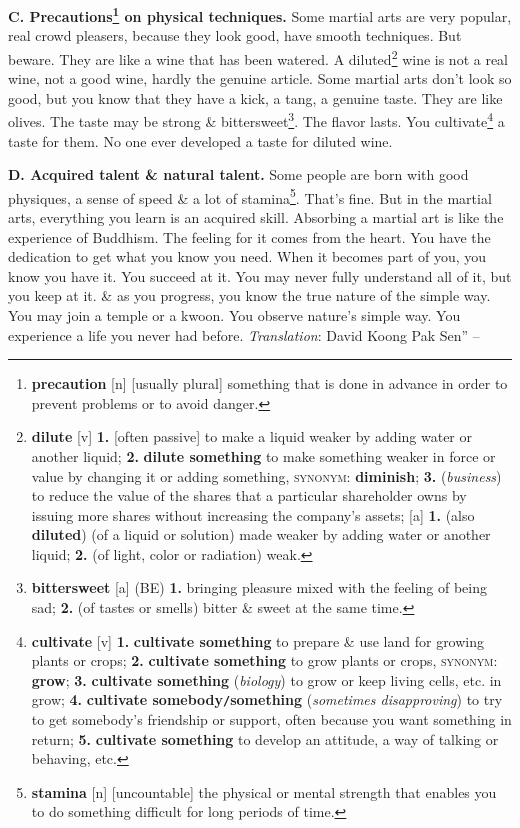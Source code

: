 \documentclass[oneside]{book}
\numberwithin{equation}{section}
\begin{document}
\textbf{C. Precautions\footnote{\textbf{precaution} [n] [usually plural] something that is done in advance in order to prevent problems or to avoid danger.} on physical techniques.} Some martial arts are very popular, real crowd pleasers, because they look good, have smooth techniques. But beware. They are like a wine that has been watered. A diluted\footnote{\textbf{dilute} [v] \textbf{1.} [often passive] to make a liquid weaker by adding water or another liquid; \textbf{2.} \textbf{dilute something} to make something weaker in force or value by changing it or adding something, \textsc{synonym}: \textbf{diminish}; \textbf{3.} (\textit{business}) to reduce the value of the shares that a particular shareholder owns by issuing more shares without increasing the company's assets; [a] \textbf{1.} (also \textbf{diluted}) (of a liquid or solution) made weaker by adding water or another liquid; \textbf{2.} (of light, color or radiation) weak.} wine is not a real wine, not a good wine, hardly the genuine article. Some martial arts don't look so good, but you know that they have a kick, a tang, a genuine taste. They are like olives. The taste may be strong \& bittersweet\footnote{\textbf{bittersweet} [a] (BE) \textbf{1.} bringing pleasure mixed with the feeling of being sad; \textbf{2.} (of tastes or smells) bitter \& sweet at the same time.}. The flavor lasts. You cultivate\footnote{\textbf{cultivate} [v] \textbf{1.} \textbf{cultivate something} to prepare \& use land for growing plants or crops; \textbf{2.} \textbf{cultivate something} to grow plants or crops, \textsc{synonym}: \textbf{grow}; \textbf{3.} \textbf{cultivate something} (\textit{biology}) to grow or keep living cells, etc. in grow; \textbf{4.} \textbf{cultivate somebody\texttt{/}something} (\textit{sometimes disapproving}) to try to get somebody's friendship or support, often because you want something in return; \textbf{5.} \textbf{cultivate something} to develop an attitude, a way of talking or behaving, etc.} a taste for them. No one ever developed a taste for diluted wine.

\textbf{D. Acquired talent \& natural talent.} Some people are born with good physiques, a sense of speed \& a lot of stamina\footnote{\textbf{stamina} [n] [uncountable] the physical or mental strength that enables you to do something difficult for long periods of time.}. That's fine. But in the martial arts, everything you learn is an acquired skill. Absorbing a martial art is like the experience of Buddhism. The feeling for it comes from the heart. You have the dedication to get what you know you need. When it becomes part of you, you know you have it. You succeed at it. You may never fully understand all of it, but you keep at it. \& as you progress, you know the true nature of the simple way. You may join a temple or a kwoon. You observe nature's simple way. You experience a life you never had before. \textit{Translation}: David Koong Pak Sen'' -- \cite[pp. 6--10]{Lee2011}
\end{document}
